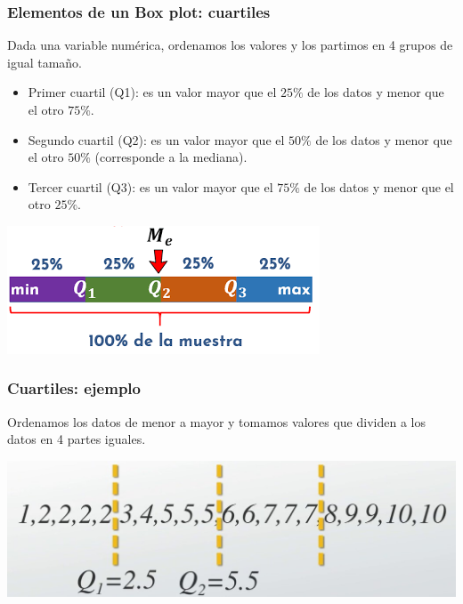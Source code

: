 \documentclass[aspectratio=169,12pt]{beamer}
\begin{document}

\begin{frame}
\frametitle{Elementos de un Box plot: cuartiles}

Dada una variable numérica, ordenamos los valores y los partimos en 4 grupos de igual tamaño.

\begin{itemize}
\item Primer cuartil (Q1): es un valor mayor que el $25\%$ de los datos y menor que el otro $75\%$.
\item Segundo cuartil (Q2): es un valor mayor que el $50\%$ de los datos y menor que el otro $50\%$ (corresponde a la mediana).
\item Tercer cuartil (Q3): es un valor mayor que el $75\%$ de los datos y menor que el otro $25\%$.
\end{itemize}

\begin{center}
\includegraphics[scale=.5]{clase4-cuartiles-esquema.png}
\end{center}




\end{frame}


\begin{frame}
\frametitle{Cuartiles: ejemplo}

Ordenamos los datos de menor a mayor y tomamos valores que dividen a los datos en 4 partes iguales.

\begin{center}
\includegraphics[scale=.3]{clase4-cuartiles-Q1yQ2.jpg}
\end{center}

\end{frame}
\end{document}
